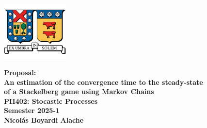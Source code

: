 \documentclass[10pt,letterpaper]{article}
\begin{document}
\thispagestyle{empty}

\begin{center}
\includegraphics[width=3.4cm]{logousm.jpg}
\end{center}

\vskip 0.5cm

\begin{center}
\textbf{\large Proposal: \\ An estimation of the convergence time to the steady-state\\
of a Stackelberg game using Markov Chains \medskip \\ 
PII402: Stocastic Processes\medskip \\
Semester 2025-1\\
Nicolás Boyardi Alache}
\end{center}

\noindent

\bigskip
\end{document}
